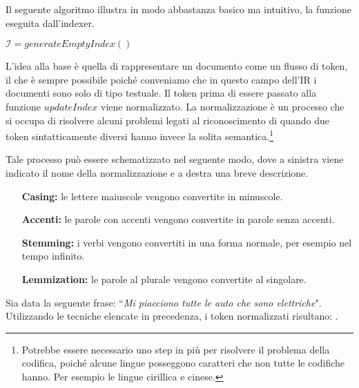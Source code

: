 Il seguente algoritmo illustra in modo abbastanza basico ma intuitivo, la funzione eseguita dall'indexer.
\begin{algorithm}[h]
	\small
	\DontPrintSemicolon
	\BlankLine
	$\mathcal{I} = generateEmptyIndex()$\;
	\caption{\textsc{}}
	\label{alg:indexing}
\end{algorithm}
L'idea alla base è quella di rappresentare un documento come un flusso di token, il che è sempre possibile
poiché conveniamo che in questo campo dell'IR i documenti sono solo di tipo testuale.
Il token prima di essere passato alla funzione $updateIndex$ viene normalizzato. La normalizzazione è un processo
che si occupa di risolvere alcuni problemi legati al riconoscimento di  quando due token sintatticamente diversi
hanno invece la solita semantica.\footnote{Potrebbe essere necessario uno step in più per risolvere il problema della codifica, poiché alcune lingue posseggono caratteri che non tutte le codifiche hanno. Per esempio le lingue cirillica e cinese.}

Tale processo può essere schematizzato nel seguente modo, dove a sinistra viene indicato
il nome della normalizzazione e a destra una breve descrizione.

\begin{itemize}
	\item[\textbf{Casing:}] le lettere maiuscole vengono convertite in minuscole.
	\item[\textbf{Accenti:}] le parole con accenti vengono convertite in parole senza accenti.
	\item[\textbf{Stemming:}] i verbi vengono convertiti in una forma normale, per esempio nel tempo infinito.
	\item[\textbf{Lemmization:}] le parole al plurale vengono convertite al singolare.
\end{itemize}

\begin{esempio}[normalization]
	Sia data la seguente frase: ``\textit{Mi piacciono tutte le auto che sono elettriche}".
	Utilizzando le tecniche elencate in precedenza, i token normalizzati risultano:
	    
	  .
\end{esempio}

